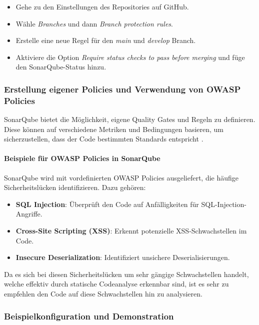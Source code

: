 \begin{itemize}
    \item Gehe zu den Einstellungen des Repositories auf GitHub.
    \item Wähle \textit{Branches} und dann \textit{Branch protection rules}.
    \item Erstelle eine neue Regel für den \textit{main} und \textit{develop} Branch.
    \item Aktiviere die Option \textit{Require status checks to pass before merging} und füge den SonarQube-Status hinzu.
\end{itemize}

\subsubsection{Erstellung eigener Policies und Verwendung von OWASP Policies}

SonarQube bietet die Möglichkeit, eigene Quality Gates und Regeln zu definieren. Diese können auf verschiedene Metriken und Bedingungen basieren, um sicherzustellen, dass der Code bestimmten Standards entspricht \cite{SonarSource2023}.

\paragraph{Beispiele für OWASP Policies in SonarQube}

SonarQube wird mit vordefinierten OWASP Policies ausgeliefert, die häufige Sicherheitslücken identifizieren. Dazu gehören:

\begin{itemize}
    \item \textbf{SQL Injection}: Überprüft den Code auf Anfälligkeiten für SQL-Injection-Angriffe.
    \item \textbf{Cross-Site Scripting (XSS)}: Erkennt potenzielle XSS-Schwachstellen im Code.
    \item \textbf{Insecure Deserialization}: Identifiziert unsichere Deserialisierungen.
\end{itemize}

Da es sich bei diesen Sicherheitslücken um sehr gängige Schwachstellen handelt, welche effektiv durch statische Codeanalyse erkennbar sind, ist es sehr zu empfehlen den Code auf diese Schwachstellen hin zu analysieren.

\subsubsection{Beispielkonfiguration und Demonstration}

